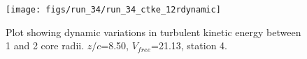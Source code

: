 \begin{figure}[H]
\centering
\texttt{[image: figs/run\_34/run\_34\_ctke\_12rdynamic]}
\caption{Plot showing dynamic variations in turbulent kinetic energy between 1 and 2 core radii. $z/c$=8.50, $V_{free}$=21.13, station 4.}
\label{fig:run_34_ctke_12rdynamic}
\end{figure}


